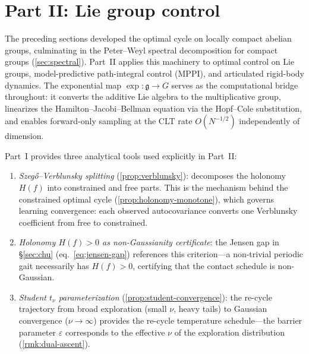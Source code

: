 \section*{Part II: Lie group control}

The preceding sections developed the optimal cycle on locally compact abelian groups, culminating in the Peter--Weyl spectral decomposition for compact groups (\cref{sec:spectral}). Part~II applies this machinery to optimal control on Lie groups, model-predictive path-integral control (MPPI), and articulated rigid-body dynamics. The exponential map $\exp : \mathfrak{g} \to G$ serves as the computational bridge throughout: it converts the additive Lie algebra to the multiplicative group, linearizes the Hamilton--Jacobi--Bellman equation via the Hopf--Cole substitution, and enables forward-only sampling at the CLT rate $O(N^{-1/2})$ independently of dimension.

Part~I provides three analytical tools used explicitly in Part~II:
\begin{enumerate}[label=(\alph*)]
\item \emph{Szeg\H{o}--Verblunsky splitting} (\cref{prop:verblunsky}): decomposes the holonomy $H(f)$ into constrained and free parts. This is the mechanism behind the constrained optimal cycle (\cref{prop:holonomy-monotone}), which governs learning convergence: each observed autocovariance converts one Verblunsky coefficient from free to constrained.
\item \emph{Holonomy $H(f) > 0$ as non-Gaussianity certificate}: the Jensen gap in \S\ref{sec:chu} (eq.~\eqref{eq:jensen-gap}) references this criterion---a non-trivial periodic gait necessarily has $H(f) > 0$, certifying that the contact schedule is non-Gaussian.
\item \emph{Student $t_\nu$ parameterization} (\cref{prop:student-convergence}): the re-cycle trajectory from broad exploration (small $\nu$, heavy tails) to Gaussian convergence ($\nu \to \infty$) provides the re-cycle temperature schedule---the barrier parameter $\varepsilon$ corresponds to the effective $\nu$ of the exploration distribution (\cref{rmk:dual-ascent}).
\end{enumerate}
